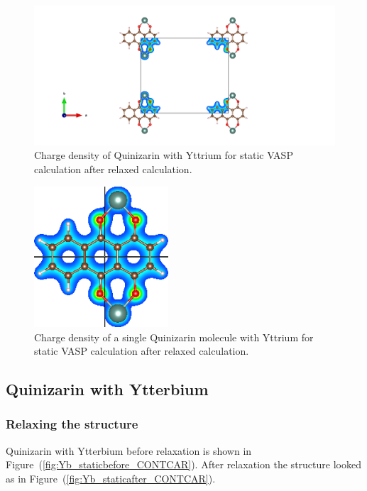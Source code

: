 \documentclass{article}
\begin{document}
      \begin{figure}[H]
        \centering
        \includegraphics[width = \textwidth]{../fig/Y_staticafter_CHGCAR.png}
        \caption{Charge density of Quinizarin with Yttrium for static VASP calculation after relaxed calculation. }
        \label{fig:Y_staticafter_CHGCAR}
      \end{figure}

      \begin{figure}[H]
        \centering
        \includegraphics[width = 5cm]{../fig/Y_staticafter_CHGDENSITY.png}
        \caption{Charge density of a single Quinizarin molecule with Yttrium for static VASP calculation after relaxed calculation. }
        \label{fig:Y_staticafter_CHGDENSITY}
      \end{figure}

      \vspace{1cm}

  \subsection{Quinizarin with Ytterbium}

    \subsubsection{Relaxing the structure}

      Quinizarin with Ytterbium before relaxation is shown in Figure~(\ref{fig:Yb_staticbefore_CONTCAR}). After relaxation the structure looked as in Figure~(\ref{fig:Yb_staticafter_CONTCAR}). \\
\end{document}
